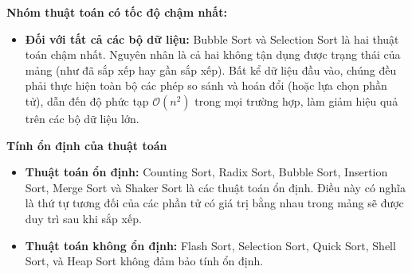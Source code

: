 \textbf{Nhóm thuật toán có tốc độ chậm nhất:}

\begin{itemize}
    \item \textbf{Đối với tất cả các bộ dữ liệu:} Bubble Sort và Selection Sort là hai thuật toán chậm nhất. Nguyên nhân là cả hai không tận dụng được trạng thái của mảng (như đã sắp xếp hay gần sắp xếp). Bất kể dữ liệu đầu vào, chúng đều phải thực hiện toàn bộ các phép so sánh và hoán đổi (hoặc lựa chọn phần tử), dẫn đến độ phức tạp $\mathcal{O}(n^2)$ trong mọi trường hợp, làm giảm hiệu quả trên các bộ dữ liệu lớn.
\end{itemize}

\textbf{Tính ổn định của thuật toán}
\begin{itemize}
    \item \textbf{Thuật toán ổn định:} Counting Sort, Radix Sort, Bubble Sort, Insertion Sort, Merge Sort và Shaker Sort là các thuật toán ổn định. Điều này có nghĩa là thứ tự tương đối của các phần tử có giá trị bằng nhau trong mảng sẽ được duy trì sau khi sắp xếp.
    
    \item \textbf{Thuật toán không ổn định:} Flash Sort, Selection Sort, Quick Sort, Shell Sort, và Heap Sort không đảm bảo tính ổn định.
\end{itemize}
\newpage